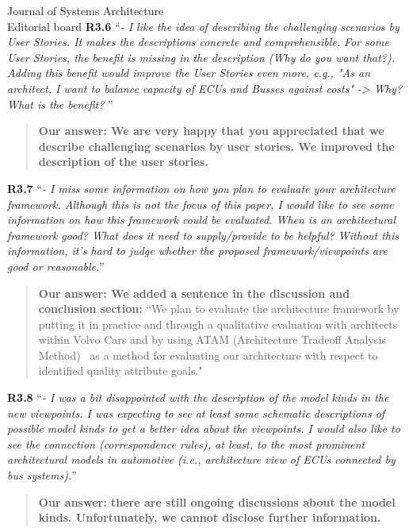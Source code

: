 \documentclass[a4paper,10pt]{letter}
\begin{document}
\begin{letter}{Journal of Systems Architecture\\
    Editorial board}
\textbf{R3.6} ``\textit{- I like the idea of describing the challenging scenarios by User Stories. It makes the descriptions concrete and comprehensible. For some User Stories, the benefit is missing in the description (Why do you want that?). Adding this benefit would improve the User Stories even more, e.g., "As an architect, I want to balance capacity of ECUs and Busses against costs" -> Why? What is the benefit? }''
\begin{quote}
\textbf{Our answer: We are very happy that you appreciated that we describe challenging scenarios by user stories. We improved the description of the user stories.} %
\end{quote}

\textbf{R3.7} ``\textit{- I miss some information on how you plan to evaluate your architecture framework. Although this is not the focus of this paper, I would like to see some information on how this framework could be evaluated. When is an architectural framework good? What does it need to supply/provide to be helpful? Without this information, it's hard to judge whether the proposed framework/viewpoints are good or reasonable.}''
\begin{quote}
\textbf{Our answer: We added a sentence in the discussion and conclusion section:} ``We plan to evaluate the architecture framework by putting it in practice and through a qualitative evaluation with architects within Volvo Cars and by using ATAM (Architecture Tradeoff Analysis Method)~\cite{ATAM} as a method for evaluating our architecture with respect to identified quality attribute goals." %
\end{quote}

\textbf{R3.8} ``\textit{- I was a bit disappointed with the description of the model kinds in the new viewpoints. I was expecting to see at least some schematic descriptions of possible model kinds to get a better idea about the viewpoints. I would also like to see the connection (correspondence rules), at least, to the most prominent architectural models in automotive (i.e., architecture view of ECUs connected by bus systems).}''
\begin{quote}
\textbf{Our answer: there are still ongoing discussions about the model kinds. Unfortunately, we cannot disclose further information.}
\end{quote}


\end{letter}
\end{document}

